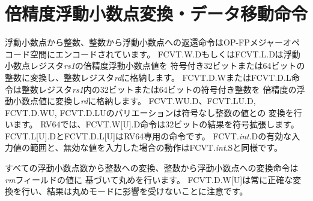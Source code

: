 \section{倍精度浮動小数点変換・データ移動命令}

\begin{comment}
Floating-point-to-integer and integer-to-floating-point conversion
instructions are encoded in the OP-FP major opcode space.
FCVT.W.D or FCVT.L.D converts a double-precision floating-point number
in floating-point register {\em rs1} to a signed 32-bit or 64-bit
integer, respectively, in integer register {\em rd}.  FCVT.D.W
or FCVT.D.L converts a 32-bit or 64-bit signed integer,
respectively, in integer register {\em rs1} into a
double-precision floating-point
number in floating-point register {\em rd}. FCVT.WU.D,
FCVT.LU.D, FCVT.D.WU, and FCVT.D.LU variants
convert to or from unsigned integer values.
For RV64, FCVT.W[U].D sign-extends the 32-bit result.
FCVT.L[U].D and FCVT.D.L[U] are RV64-only instructions.
The range of valid inputs for FCVT.{\em int}.D and
the behavior for invalid inputs are the same as for FCVT.{\em int}.S.
\end{comment}
浮動小数点から整数、整数から浮動小数点への返還命令はOP-FPメジャーオペコード空間にエンコードされています。
FCVT.W.DもしくはFCVT.L.Dは浮動小数点レジスタ{\em rs1}の倍精度浮動小数点値を
符号付き32ビットまたは64ビットの整数に変換し、整数レジスタ{\em rd}に格納します。
FCVT.D.WまたはFCVT.D.L命令は整数レジスタ{\em rs1}内の32ビットまたは64ビットの符号付き整数を
倍精度の浮動小数点値に変換し{\em rd}に格納します。
FCVT.WU.D、FCVT.LU.D, FCVT.D.WU, FCVT.D.LUのバリエーションは符号なし整数の値との
変換を行います。
RV64では、FCVT.W[U].D命令は32ビットの結果を符号拡張します。
FCVT.L[U].DとFCVT.D.L[U]はRV64専用の命令です。
FCVT.{\em int}.Dの有効な入力値の範囲と、無効な値を入力した場合の動作はFCVT.{\em int}.Sと同様です。

\begin{comment}
All floating-point to integer and integer to floating-point conversion
instructions round according to the {\em rm} field.  Note FCVT.D.W[U] always
produces an exact result and is unaffected by rounding mode.
\end{comment}
すべての浮動小数点数から整数への変換、整数から浮動小数点への変換命令は{\em rm}フィールドの値に
基づいて丸めを行います。
FCVT.D.W[U]は常に正確な変換を行い、結果は丸めモードに影響を受けないことに注意です。

